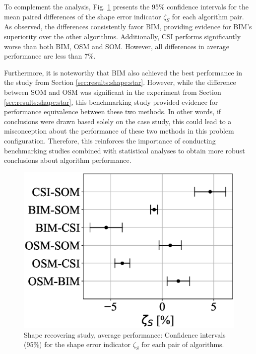 \documentclass{IEEEtran}
\begin{document}
                To complement the analysis, Fig. \ref{fig:shape:average:confidence_intervals} presents the 95\% confidence intervals for the mean paired differences of the shape error indicator $\zeta_S$ for each algorithm pair. As observed, the differences consistently favor BIM, providing evidence for BIM's superiority over the other algorithms. Additionally, CSI performs significantly worse than both BIM, OSM and SOM. However, all differences in average performance are less than 7\%.

                Furthermore, it is noteworthy that BIM also achieved the best performance in the study from Section \ref{sec:results:shape:star}. However, while the difference between SOM and OSM was significant in the experiment from Section \ref{sec:results:shape:star}, this benchmarking study provided evidence for performance equivalence between these two methods. In other words, if conclusions were drawn based solely on the case study, this could lead to a misconception about the performance of these two methods in this problem configuration. Therefore, this reinforces the importance of conducting benchmarking studies combined with statistical analyses to obtain more robust conclusions about algorithm performance.

                \begin{figure}
                    \centering
                    \includegraphics[width=.8\columnwidth]{./experiments/average/figs/confidence_intervals.eps}
                    \caption{Shape recovering study, average performance: Confidence intervals (95\%) for the shape error indicator $\zeta_S$ for each pair of algorithms.}
                    \label{fig:shape:average:confidence_intervals}
                \end{figure}
\end{document}
